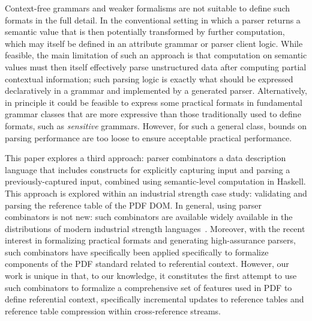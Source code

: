 Context-free grammars and weaker formalisms are not suitable to define
such formats in the full detail.
%
In the conventional setting in which a parser returns a semantic value
that is then potentially transformed by further computation, which may
itself be defined in an attribute grammar or parser client logic.
%
While feasible, the main limitation of such an approach is that
computation on semantic values must then itself effectively parse
unstructured data after computing partial contextual information;
%
such parsing logic is exactly what should be expressed declaratively
in a grammar and implemented by a generated parser.
%
Alternatively, in principle it could be feasible to express some
practical formats in fundamental grammar classes that are more
expressive than those traditionally used to define formats, such as
\emph{sensitive} grammars.
%
However, for such a general class, bounds on parsing performance are
too loose to ensure acceptable practical performance.

This paper explores a third approach: parser combinators a data
description language that includes constructs for explicitly capturing
input and parsing a previously-captured input, combined using
semantic-level computation in Haskell.
%
This approach is explored within an industrial strength case study:
validating and parsing the reference table of the PDF DOM.
%
In general, using parser combinators is not new: such combinators are
available widely available in the distributions of modern industrial
strength languages~.
%
Moreover, with the recent interest in formalizing practical formats
and generating high-assurance parsers, such combinators have
specifically been applied specifically to formalize components of the
PDF standard related to referential context.
%
However, our work is unique in that, to our knowledge, it constitutes
the first attempt to use such combinators to formalize a comprehensive
set of features used in PDF to define referential context,
specifically incremental updates to reference tables and reference
table compression within cross-reference streams.

